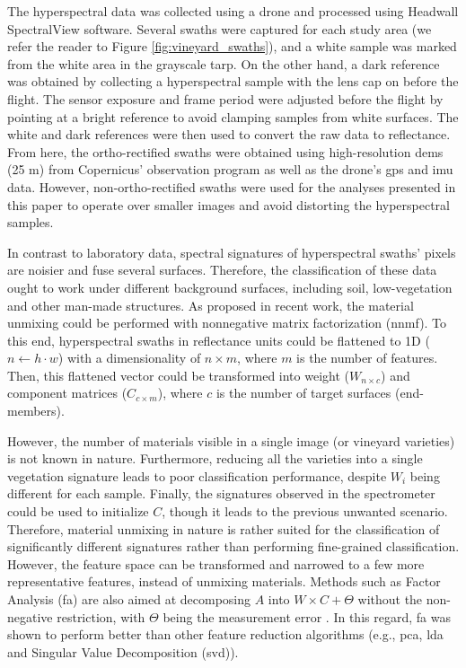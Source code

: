 The hyperspectral data was collected using a drone and processed using Headwall SpectralView\texttrademark \hspace{.5mm} software. Several swaths were captured for each study area (we refer the reader to Figure \ref{fig:vineyard_swaths}), and a white sample was marked from the white area in the grayscale tarp. On the other hand, a dark reference was obtained by collecting a hyperspectral sample with the lens cap on before the flight. The sensor exposure and frame period were adjusted before the flight by pointing at a bright reference to avoid clamping samples from white surfaces. The white and dark references were then used to convert the raw data to reflectance. From here, the ortho-rectified swaths were obtained using high-resolution \acrshort{dem}s (25 \si{\meter}) from Copernicus' observation program \cite{european_environment_agency_eu_2017} as well as the drone's \acrshort{gps} and \acrshort{imu} data. However, non-ortho-rectified swaths were used for the analyses presented in this paper to operate over smaller images and avoid distorting the hyperspectral samples.

In contrast to laboratory data, spectral signatures of hyperspectral swaths' pixels are noisier and fuse several surfaces. Therefore, the classification of these data ought to work under different background surfaces, including soil, low-vegetation and other man-made structures. As proposed in recent work, the material unmixing could be performed with nonnegative matrix factorization (\acrshort{nnmf}). To this end, hyperspectral swaths in reflectance units could be flattened to 1D ($n \gets h \cdot w$) with a dimensionality of $n \times m$, where $m$ is the number of features. Then, this flattened vector could be transformed into weight ($W_{n \times c}$) and component matrices ($C_{c \times m}$), where $c$ is the number of target surfaces (end-members). 

However, the number of materials visible in a single image (or vineyard varieties) is not known in nature. Furthermore, reducing all the varieties into a single vegetation signature leads to poor classification performance, despite $W_i$ being different for each sample. Finally, the signatures observed in the spectrometer could be used to initialize $C$, though it leads to the previous unwanted scenario. Therefore, material unmixing in nature is rather suited for the classification of significantly different signatures rather than performing fine-grained classification. However, the feature space can be transformed and narrowed to a few more representative features, instead of unmixing materials. Methods such as Factor Analysis (\acrshort{fa}) are also aimed at decomposing $A$ into $W \times C + \Theta$ without the non-negative restriction, with $\Theta$ being the measurement error \cite{bandalos_measurement_2018}. In this regard, \acrshort{fa} was shown to perform better than other feature reduction algorithms (e.g., \acrshort{pca}, \acrshort{lda} and Singular Value Decomposition (\acrshort{svd})).

